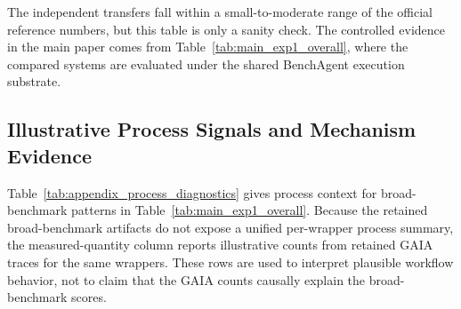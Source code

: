 The independent transfers fall within a small-to-moderate range of the official reference numbers, but this table is only a sanity check. The controlled evidence in the main paper comes from Table~\ref{tab:main_exp1_overall}, where the compared systems are evaluated under the shared BenchAgent execution substrate.

\subsection{Illustrative Process Signals and Mechanism Evidence}
\label{subsec:appendix_process_diagnostics}

Table~\ref{tab:appendix_process_diagnostics} gives process context for broad-benchmark patterns in Table~\ref{tab:main_exp1_overall}. Because the retained broad-benchmark artifacts do not expose a unified per-wrapper process summary, the measured-quantity column reports illustrative counts from retained GAIA traces for the same wrappers. These rows are used to interpret plausible workflow behavior, not to claim that the GAIA counts causally explain the broad-benchmark scores.

